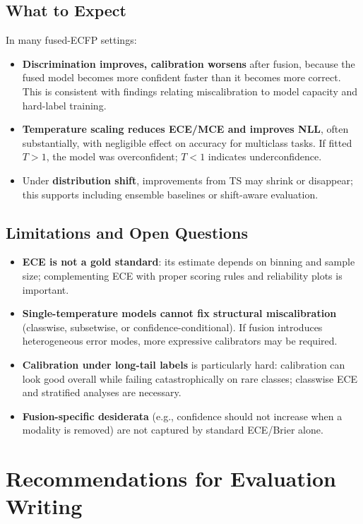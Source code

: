 \documentclass[11pt,a4paper,twocolumn]{article}
\begin{document}
\subsection{What to Expect}
In many fused-ECFP settings:
\begin{itemize}
\item \textbf{Discrimination improves, calibration worsens} after fusion,
      because the fused model becomes more confident faster than it becomes
      more correct.
      This is consistent with findings relating miscalibration to model
      capacity and hard-label training.
\item \textbf{Temperature scaling reduces ECE/MCE and improves NLL},
      often substantially, with negligible effect on accuracy for multiclass
      tasks.
      If fitted $T>1$, the model was overconfident; $T<1$ indicates
      underconfidence.
\item Under \textbf{distribution shift}, improvements from TS may shrink
      or disappear; this supports including ensemble baselines or
      shift-aware evaluation.
\end{itemize}

\subsection{Limitations and Open Questions}
\begin{itemize}
\item \textbf{ECE is not a gold standard}: its estimate depends on binning
      and sample size; complementing ECE with proper scoring rules and
      reliability plots is important.
\item \textbf{Single-temperature models cannot fix structural
      miscalibration} (classwise, subsetwise, or confidence-conditional).
      If fusion introduces heterogeneous error modes, more expressive
      calibrators may be required.
\item \textbf{Calibration under long-tail labels} is particularly hard:
      calibration can look good overall while failing catastrophically on
      rare classes; classwise ECE and stratified analyses are necessary.
\item \textbf{Fusion-specific desiderata} (e.g., confidence should not
      increase when a modality is removed) are not captured by standard
      ECE/Brier alone.
\end{itemize}

\section{Recommendations for Evaluation Writing}
\label{sec:recs}
\end{document}
